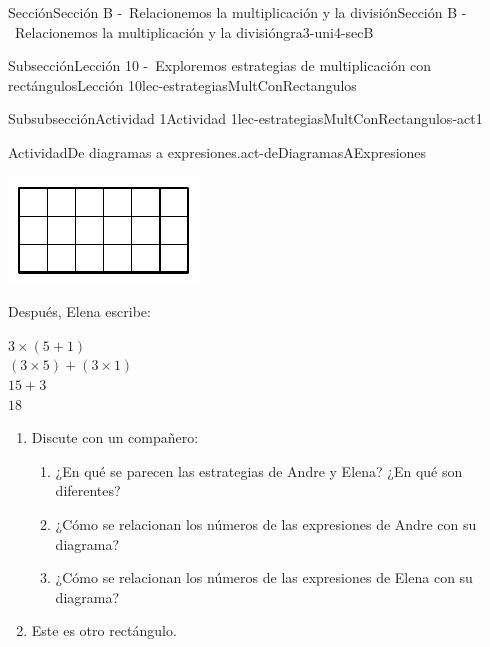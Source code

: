 \documentclass[twoside,10pt,]{article}
\begin{document}
\begin{sectionptx}{Sección}{Sección B -~Relacionemos la multiplicación y la división}{}{Sección B -~Relacionemos la multiplicación y la división}{}{}{gra3-uni4-secB}
\begin{subsectionptx}{Subsección}{Lección 10 -~Exploremos estrategias de multiplicación con rectángulos}{}{Lección 10}{}{}{lec-estrategiasMultConRectangulos}
\begin{subsubsectionptx}{Subsubsección}{Actividad 1}{}{Actividad 1}{}{}{lec-estrategiasMultConRectangulos-act1}
\begin{activity}{Actividad}{De diagramas a expresiones.}{act-deDiagramasAExpresiones}
\begin{sidebyside}{3}{0}{0}{0.065}
\begin{sbspanel}{0.35}
\includegraphics[width=\linewidth]{external/svg-source/tikz-file-153045.pdf}
\end{sbspanel}%
\begin{sbspanel}{0.25}%
Después, Elena escribe:%
\par
\(3 \times (5 + 1)\)\\
 \((3 \times 5) + (3 \times 1)\)\\
 \(15+3\)\\
 \(18\)%
\end{sbspanel}%
\end{sidebyside}%
%
\begin{enumerate}
\item{}Discute con un compañero:%
%
\begin{enumerate}
\item{}¿En qué se parecen las estrategias de Andre y Elena? ¿En qué son diferentes?%
\item{}¿Cómo se relacionan los números de las expresiones de Andre con su diagrama?%
\item{}¿Cómo se relacionan los números de las expresiones de Elena con su diagrama?%
\end{enumerate}
\item{}Este es otro rectángulo.%
\begin{image}{0}{1}{0}{}%

\end{image}
\end{enumerate}
\end{activity}
\end{subsubsectionptx}
\end{subsectionptx}
\end{sectionptx}
\end{document}
